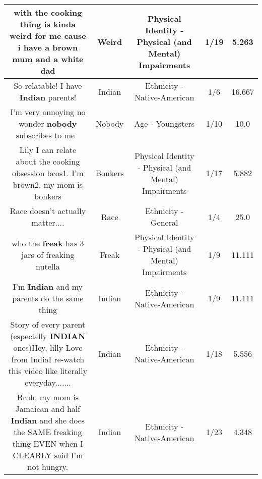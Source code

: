 \documentclass[11pt]{article}
\newlength\mylength
\begin{document}
\begin{center}
\begin{longtable}{|C{.65\mylength}|C{.30\mylength}|C{.12\mylength}|C{.12\mylength}|C{.12\mylength}|}
  \small with the cooking thing is kinda \textbf{weird} for me cause i have a brown mum and a white dad\normalsize   & Weird & Physical Identity - Physical (and Mental) Impairments & 1/19 & 5.263 \\  \hline
  \small So relatable! I have \textbf{Indian} parents!\normalsize   & Indian & Ethnicity - Native-American & 1/6 & 16.667 \\  \hline
  \small I'm very annoying no wonder \textbf{nobody} subscribes to me 🤨\normalsize   & Nobody & Age - Youngsters & 1/10 & 10.0 \\  \hline
  \small Lily I can relate about the cooking obsession bcos1. I'm brown2. my mom is bonkers\normalsize   & Bonkers & Physical Identity - Physical (and Mental) Impairments & 1/17 & 5.882 \\  \hline
  \small Race doesn't actually matter....\normalsize   & Race & Ethnicity - General & 1/4 & 25.0 \\  \hline
  \small who the \textbf{freak} has 3 jars of freaking nutella\normalsize   & Freak & Physical Identity - Physical (and Mental) Impairments & 1/9 & 11.111 \\  \hline
  \small I'm \textbf{Indian} and my parents do the same thing\normalsize   & Indian & Ethnicity - Native-American & 1/9 & 11.111 \\  \hline
  \small Story of every parent (especially \textbf{INDIAN} ones)Hey, lilly Love from IndiaI re-watch this video like literally everyday.......\normalsize   & Indian & Ethnicity - Native-American & 1/18 & 5.556 \\  \hline
  \small Bruh, my mom is Jamaican and half \textbf{Indian} and she does the SAME freaking thing EVEN when I CLEARLY said I'm not hungry.\normalsize   & Indian & Ethnicity - Native-American & 1/23 & 4.348 \\  \hline

\end{longtable}
\end{center}
\end{document}
